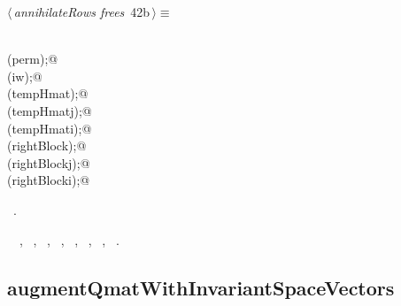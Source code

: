 \documentclass{article}
\begin{document}
\begin{flushleft} \small
\begin{minipage}{\linewidth}\label{scrap56}\raggedright\small
{} $\langle\,${\itshape annihilateRows frees}\nobreak\ {\footnotesize {42b}}$\,\rangle\equiv$
\vspace{-1ex}
\begin{list}{}{} \item
\mbox{}\verb@@\\
\mbox{}\verb@free(perm);@\\
\mbox{}\verb@free(iw);@\\
\mbox{}\verb@free(tempHmat);@\\
\mbox{}\verb@free(tempHmatj);@\\
\mbox{}\verb@free(tempHmati);@\\
\mbox{}\verb@free(rightBlock);@\\
\mbox{}\verb@free(rightBlockj);@\\
\mbox{}\verb@free(rightBlocki);@\\
\mbox{}\verb@@{\NWsep}
\end{list}
\vspace{-1.5ex}
\footnotesize
\begin{list}{}{\setlength{\itemsep}{-\parsep}\setlength{\itemindent}{-\leftmargin}}
\item \NWtxtMacroRefIn\ .
\item \NWtxtIdentsUsed\nobreak\  \verb@iw@\nobreak\ , \verb@perm@\nobreak\ , \verb@rightBlock@\nobreak\ , \verb@rightBlocki@\nobreak\ , \verb@rightBlockj@\nobreak\ , \verb@tempHmat@\nobreak\ , \verb@tempHmati@\nobreak\ , \verb@tempHmatj@\nobreak\ .
\item{}
\end{list}
\end{minipage}\vspace{4ex}
\end{flushleft}
\subsection{augmentQmatWithInvariantSpaceVectors}
\label{sec:augmentQmatWithInvariantSpaceVectors}
\end{document}
